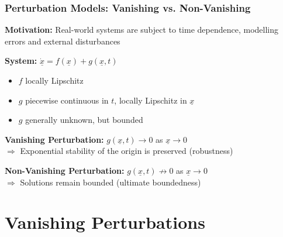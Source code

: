 \documentclass[student, noshadow, lsr, english, aspectratio=169, t]{ITR_LSR_slides}
\begin{document}
\begin{frame}
	\frametitle{Perturbation Models: Vanishing vs. Non-Vanishing}
	\textbf{Motivation:} Real-world systems are subject to time dependence, modelling errors and external disturbances

	\vspace{0.5em}
	\textbf{System:} $\dot{\underline{x}} = f(\underline{x}) + g(\underline{x}, t)$
	\begin{itemize}
		\item $f$ locally Lipschitz
		\item $g$ piecewise continuous in $t$, locally Lipschitz in $\underline{x}$
		\item $g$ generally unknown, but bounded
	\end{itemize}

	\vspace{0.5em}
	\textbf{Vanishing Perturbation:} $g(\underline{x}, t) \to 0$ as $\underline{x} \to 0$ \\
	$\Rightarrow$ Exponential stability of the origin is preserved (robustness)

	\vspace{0.3em}
	\textbf{Non-Vanishing Perturbation:} $g(\underline{x}, t) \not\to 0$ as $\underline{x} \to 0$ \\
	$\Rightarrow$ Solutions remain bounded (ultimate boundedness)
\end{frame}


\section{Vanishing Perturbations}
\end{document}
